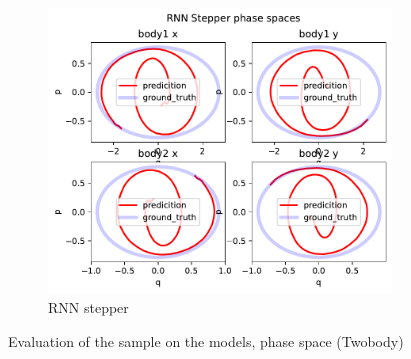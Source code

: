 \begin{figure}[H]
\begin{subfigure}[b]{0.3\textwidth}
		\centering
		\includegraphics[width=\textwidth]{chapters/chapter5/body2_rne_ps.pdf}
		\caption{RNN stepper}
	\end{subfigure}
	
	\caption{Evaluation of the sample on the models, phase space (Twobody)}
\end{figure}



